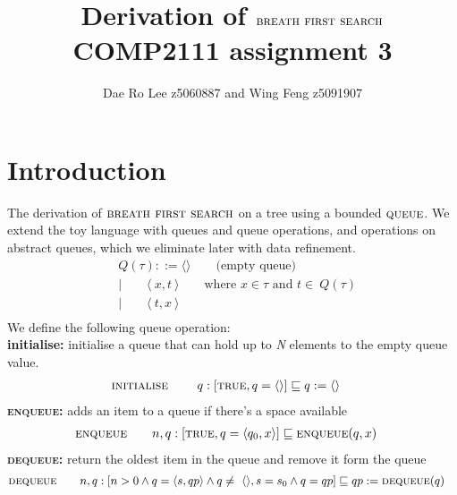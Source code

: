 \documentclass[headings=small,a4paper,12pt]{scrartcl}
\title{Derivation of $\bfs$\\
\large COMP2111 assignment 3}
\author{Dae Ro Lee z5060887 and Wing Feng z5091907}
\newcommand{\bfs}{\textsc{breath first search}\xspace}
\newcommand{\qu}{\textsc{queue}\xspace}
\newcommand{\enq}{\textsc{enqueue}\xspace}
\newcommand{\deq}{\textsc{dequeue}\xspace}
\newcommand{\ini}{\textsc{initialise}\xspace}
\begin{document}
\maketitle
%
\section{Introduction}
\label{sec:introduction}
The derivation of $\bfs$ on a tree using a bounded $\qu$. 
%
We extend the toy language with queues and queue operations, and operations on abstract queues, which we eliminate later with data refinement. 
\begin{align*}
    &Q(\tau) ::= \langle\rangle\qquad\text{(empty queue)}\\
    &|\qquad\langle~x,t~\rangle\qquad\text{where $x\in\tau$ and $t\in~Q(\tau)$}\\
    &|\qquad\langle~t,x~\rangle\\
\end{align*}
We define the following queue operation:\\
\textbf{initialise:} initialise a queue that can hold up to \textit{N} elements to the empty queue value.
\begin{align*}
  &\ini\qquad~q :[\True, q = \langle\rangle] \isrefinedby q\Ass \langle\rangle
\end{align*}
\textbf{\enq:} adds an item to a queue if there's a space available 
\begin{align*}
  &\enq\qquad n,q:[\True, q=\langle q_0,x\rangle]\isrefinedby \enq(q,x)
\end{align*}
%
\textbf{\deq:} return the oldest item in the queue and remove it form the queue\\
\begin{align*}
    &\deq\qquad n,q:[n>0\And q=\langle s,qp\rangle\And q\ne~\langle\rangle, s= s_0\And q = qp] \isrefinedby qp \Ass \deq(q) 
\end{align*}
\break
\end{document}
